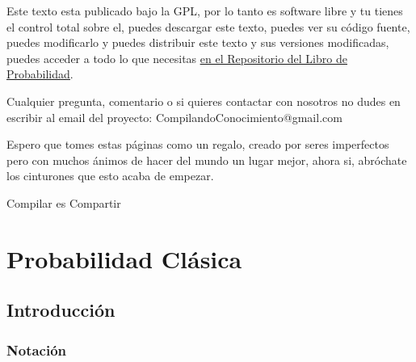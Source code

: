 \documentclass[12pt, fleqn]{report}                             %
\theoremstyle{break}                                            %
\begin{document}
    Este texto esta publicado bajo la GPL, por lo tanto es software libre y tu tienes el control total sobre
    el, puedes descargar este texto, puedes ver su código fuente, puedes modificarlo y puedes distribuir este
    texto y sus versiones modificadas, puedes acceder a todo lo que necesitas 
    \href{http://www.github.com/CompilandoConocimiento/LibroProbabilidad}
    {\underline{en el Repositorio del Libro de Probabilidad}}. 

    Cualquier pregunta, comentario o si quieres contactar con nosotros no dudes en escribir al email del proyecto:
    CompilandoConocimiento@gmail.com

    Espero que tomes estas páginas como un regalo, creado por seres imperfectos pero con muchos ánimos de hacer
    del mundo un lugar mejor, ahora si, abróchate los cinturones que esto acaba de empezar.

    \begin{flushright}
        Compilar es Compartir
    \end{flushright}




\part{Probabilidad Clásica}
\clearpage


    \chapter{Introducción}



        \clearpage
        \section{Notación}
\end{document}
